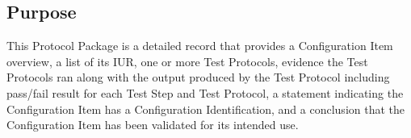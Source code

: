 \subsection{Purpose}
This Protocol Package is a detailed record that provides a Configuration Item
overview, a list of its IUR, one or more Test Protocols, evidence the Test
Protocols ran along with the output produced by the Test Protocol including
pass/fail result for each Test Step and Test Protocol, a statement indicating
the Configuration Item has a Configuration Identification, and a conclusion that
the Configuration Item has been validated for its intended use.
